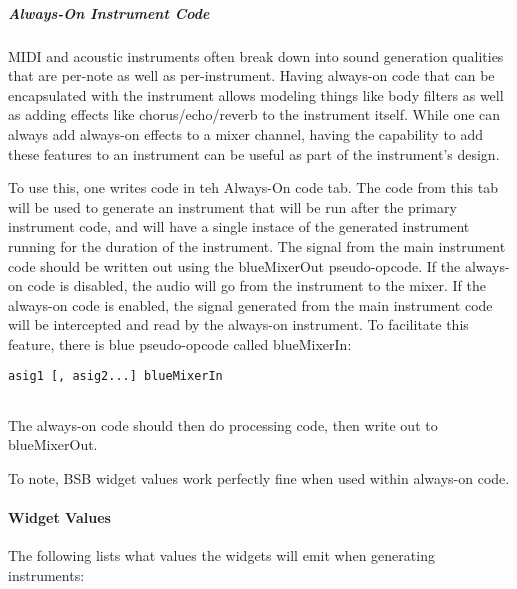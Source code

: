 \subparagraph{Always-On Instrument Code}

MIDI and acoustic instruments often break down into sound generation
qualities that are per-note as well as per-instrument. Having always-on
code that can be encapsulated with the instrument allows modeling things
like body filters as well as adding effects like chorus/echo/reverb to
the instrument itself. While one can always add always-on effects to a
mixer channel, having the capability to add these features to an
instrument can be useful as part of the instrument's design.

To use this, one writes code in teh Always-On code tab. The code from
this tab will be used to generate an instrument that will be run after
the primary instrument code, and will have a single instace of the
generated instrument running for the duration of the instrument. The
signal from the main instrument code should be written out using the
blueMixerOut pseudo-opcode. If the always-on code is disabled, the audio
will go from the instrument to the mixer. If the always-on code is
enabled, the signal generated from the main instrument code will be
intercepted and read by the always-on instrument. To facilitate this
feature, there is blue pseudo-opcode called blueMixerIn:

\begin{verbatim}
asig1 [, asig2...] blueMixerIn        
      
\end{verbatim}

The always-on code should then do processing code, then write out to
blueMixerOut.

To note, BSB widget values work perfectly fine when used within
always-on code.

\paragraph{Widget Values}

The following lists what values the widgets will emit when generating
instruments:


